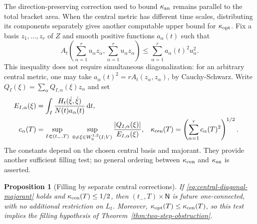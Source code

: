 \documentclass[10pt,a4paper]{article}
\numberwithin{equation}{section}
\newtheorem{proposition}[theorem]{Proposition}
\theoremstyle{definition}
\theoremstyle{remark}
\newcommand{\dd}{\mathrm d}
\begin{document}
The direction-preserving correction used to bound
$\kappa_{\rm an}$ remains parallel to the total bracket area.
When the central metric has different time scales, distributing its
components separately gives another computable upper bound for
$\kappa_{\rm opt}$.
Fix a basis $z_1,\ldots,z_r$ of $Z$ and smooth positive functions
$a_\alpha(t)$ such that
\begin{equation}
 A_t\left(\sum_{\alpha=1}^r u_\alpha z_\alpha,
           \sum_{\alpha=1}^r u_\alpha z_\alpha\right)
 \le \sum_{\alpha=1}^r a_\alpha(t)^2u_\alpha^2.
 \label{eq:central-diagonal-majorant}
\end{equation}
This inequality does not require simultaneous diagonalization: for an
arbitrary central metric, one may take
$a_\alpha(t)^2=rA_t(z_\alpha,z_\alpha)$, by Cauchy-Schwarz.
Write $Q_I(\xi)=\sum_\alpha Q_{I,\alpha}(\xi)z_\alpha$ and set
\begin{align}
 E_{I,\alpha}(\xi)
  &=\int_I\frac{H_t(\dot\xi,\dot\xi)}{N(t)a_\alpha(t)}\,\dd t,
 \notag\\
 c_\alpha(T)
  &=\sup_{I\Subset(t_-,T)}\ 
    \sup_{0\ne\xi\in W^{1,2}_0(I;V)}
       \frac{|Q_{I,\alpha}(\xi)|}{E_{I,\alpha}(\xi)},
 &
 \kappa_{\rm cen}(T)&=
       \left(\sum_{\alpha=1}^r c_\alpha(T)^2\right)^{1/2}.
 \label{eq:central-component-constant}
\end{align}
The constants depend on the chosen central basis and majorant.  They
provide another sufficient filling test; no general ordering between
$\kappa_{\rm cen}$ and $\kappa_{\rm an}$ is asserted.

\begin{proposition}[Filling by separate central corrections]
\label{prop:central-component-filling}
If \eqref{eq:central-diagonal-majorant} holds and
$\kappa_{\rm cen}(T)\le1/2$, then $(t_-,T)\times\mathsf N$ is future
one-connected, with no additional restriction on $L_t$.
Moreover, $\kappa_{\rm opt}(T)\le\kappa_{\rm cen}(T)$, so this test
implies the filling hypothesis of Theorem~\ref{thm:two-step-obstruction}.
\end{proposition}
\end{document}
